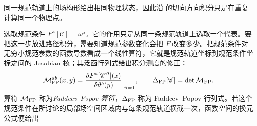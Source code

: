 同一规范轨道上的场构形给出相同物理状态，因此沿 的切向方向积分只是在重复计算同一个物理点。

选取规范条件 $F^a[\mathscr C]=\omega^a$。它的作用只是从同一条规范轨道上选取一个代表。要把这一步放进路径积分，需要知道规范参数变化会把 $F$ 改变多少。把规范条件对无穷小规范参数的函数导数看成一个线性算符，它就是规范轨道坐标到规范条件坐标之间的 Jacobian 核；其泛函行列式给出积分测度的修正：
\begin{equation}
{
 \mathcal M_{\rm FP}^{ab}(x,y)
 =\left.\frac{\delta F^a[\mathscr C^\vartheta](x)}{\delta\vartheta^b(y)}\right|_{\vartheta=0},
 \qquad
 \Delta_{\rm FP}[\mathscr C]=\det\mathcal M_{\rm FP}.}
\label{eq:fp-jacobian-definition-dp68}
\end{equation}
算符 $\mathcal M_{\rm FP}$ 称为\emph{Faddeev--Popov 算符}，$\Delta_{\rm FP}$ 称为 Faddeev--Popov 行列式。若这个规范条件在所讨论的局部场空间区域内与每条规范轨道横截一次，函数空间的换元公式便给出


